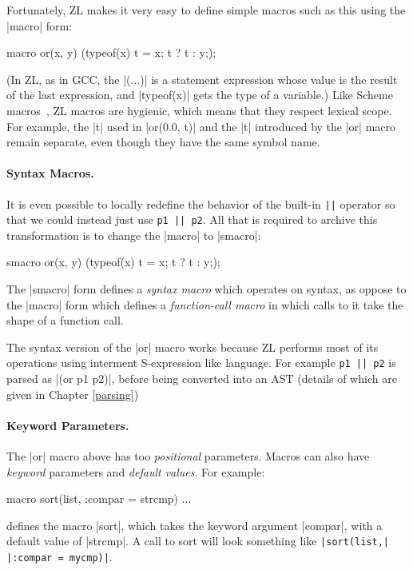 Fortunately, ZL makes it very easy to define simple macros such as this
using the |macro| form:
\label{or}
\begin{code}
macro or(x, y) { ({typeof(x) t = x; t ? t : y;}); }
\end{code}
(In ZL, as in GCC, the |({...})| is a statement expression whose value
is the result of the last expression, and |typeof(x)| gets the type of
a variable.)  Like Scheme macros~\cite{syn-abst}, ZL macros
are hygienic, which means that they respect lexical scope.  For
example, the |t| used in |or(0.0, t)| and the |t| introduced by the
|or| macro remain separate, even though they have the same symbol
name.

\paragraph{Syntax Macros.}

It is even possible to locally redefine the behavior of the built-in
\verb/||/ operator so that we could instead just use \verb/p1 || p2/.
All that is required to archive this transformation is to change the
|macro| to |smacro|:
\begin{code}
smacro or(x, y) { ({typeof(x) t = x; t ? t : y;}); }
\end{code}
The |smacro| form defines a \textit{syntax macro} which operates on
syntax, as oppose to the |macro| form which defines a \textit{function-call
  macro} in which calls to it take the shape of a function call.

The syntax version of the |or| macro works because ZL performs most of
its operations using interment S-expression like language.  For
example \verb/p1 || p2/ is parsed as |(or p1 p2)|, before being
converted into an AST (details of which are given in Chapter
\ref{parsing})

\paragraph{Keyword Parameters.}

The |or| macro above has too \textit{positional} parameters.  Macros
can also have \textit{keyword} parameters and \textit{default values}.
For example:
\begin{code}
macro sort(list, :compar = strcmp) {...}
\end{code}
defines the macro |sort|, which takes the keyword argument |compar|,
with a default value of |strcmp|.  A call to sort will look something
like {\tt|sort(list,| |:compar = mycmp)|}.

